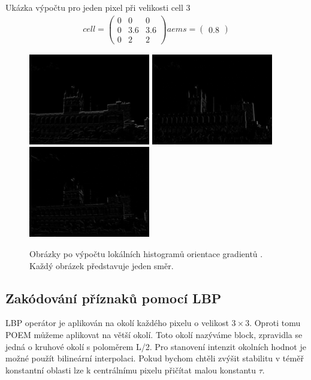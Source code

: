 \documentclass{report}
\begin{document}
Ukázka výpočtu pro jeden pixel při velikosti cell 3
\begin{align}
	\label{aems_detail}
		cell = \begin{pmatrix}0 & 0 & 0 \\ 0 & 3.6 & 3.6 \\ 0 & 2 & 2 \end{pmatrix}
		aems = \begin{pmatrix}0.8 \end{pmatrix}
\end{align}

\begin{figure}[H]
	\centering
	\includegraphics[width=150pt]{./img/aems0.png}
	\includegraphics[width=150pt]{./img/aems1.png}
	\includegraphics[width=150pt]{./img/aems2.png}
	\caption{Obrázky po výpočtu lokálních histogramů orientace gradientů . Každý obrázek představuje jeden směr.}
\end{figure}

\subsection{Zakódování příznaků pomocí LBP}
LBP operátor je aplikován na okolí každého pixelu o velikost $3 \times 3$. Oproti tomu POEM můžeme aplikovat na větší okolí. Toto okolí nazýváme block, zpravidla se jedná o kruhové okolí s poloměrem L/2. Pro stanovení intenzit okolních hodnot je možné použít bilineární interpolaci. Pokud bychom chtěli zvýšit stabilitu v téměř konstantní oblasti lze k centrálnímu pixelu přičítat malou konstantu $\tau$.
\end{document}
